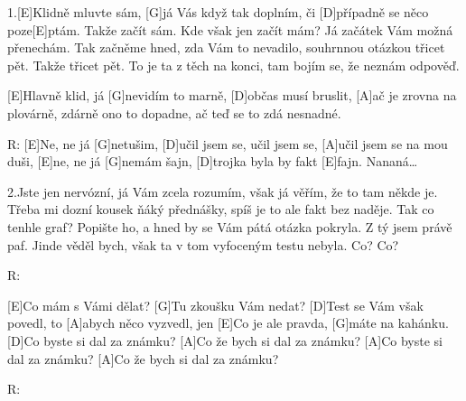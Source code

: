 
1.[E]Klidně mluvte sám, [G]já Vás když tak doplním, 
či [D]případně se něco poze[E]ptám.
Takže začít sám. Kde však jen začít mám?
Já začátek Vám možná přenechám.
Tak začněme hned, zda Vám to nevadilo, 
souhrnnou otázkou třicet pět.
Takže třicet pět. To je ta z těch na konci,
tam bojím se, že neznám odpověď.

[E]Hlavně klid, já [G]nevidím to marně,
[D] občas musí bruslit, 
[A]ač je zrovna na plovárně,
zdárně ono to dopadne,
ač teď se to zdá nesnadné.

R: [E]Ne, ne já [G]netušim,
[D]učil jsem se, učil jsem se, [A]učil jsem se na mou duši,
[E]ne, ne já [G]nemám šajn,
[D]trojka byla by fakt [E]fajn.
Nananá… \slpc


2.Jste jen nervózní, já Vám zcela rozumím,
však já věřím, že to tam někde je. 
Třeba mi dozní kousek ňáký přednášky,
spíš je to ale fakt bez naděje. 
Tak co tenhle graf? Popište ho, a hned by se
Vám pátá otázka pokryla.  
Z tý jsem právě paf. Jinde věděl bych, však ta v tom
vyfoceným testu nebyla.
Co?
Co?

R:

[E]Co mám s Vámi dělat? [G]Tu zkoušku Vám nedat?
[D]Test se Vám však povedl, to [A]abych něco vyzvedl, jen
[E]Co je ale pravda, [G]máte na kahánku.
[D]Co byste si dal za známku?
[A]Co že bych si dal za známku?
[A]Co byste si dal za známku?
[A]Co že bych si dal za známku?

R: